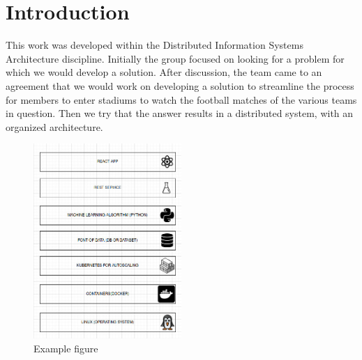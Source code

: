 \section{Introduction}
\quad This work was developed within the Distributed Information Systems Architecture discipline.
Initially the group focused on looking for a problem for which we would develop a solution. After discussion, the team came to an agreement that we would work on developing a solution to streamline the process for members to enter stadiums to watch the football matches of the various teams in question.
Then we try that the answer results in a distributed system, with an organized architecture.
\begin{figure}[H]
    \centering
    \includegraphics[width=0.5\textwidth]{assets/index.jpg}
    \caption{Example figure}
    \label{fig:example}
  \end{figure}
